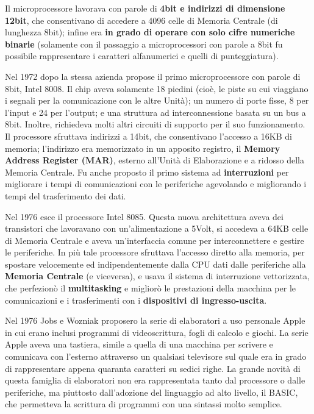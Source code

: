 \documentclass[12pt]{article}
\begin{document}
Il microprocessore lavorava con parole di\textbf{ 4bit e indirizzi di dimensione 12bit}, che consentivano di accedere a 4096 celle di Memoria Centrale (di lunghezza 8bit); infine era \textbf{in grado di operare con solo cifre numeriche binarie }(solamente con il passaggio a microprocessori con parole a 8bit fu possibile rappresentare i caratteri alfanumerici e quelli di punteggiatura).\par\medskip\noindent
Nel 1972 dopo la stessa azienda propose il primo microprocessore con parole di 8bit, Intel 8008. Il chip aveva solamente 18 piedini (cioè, le piste su cui viaggiano i segnali per la comunicazione con le altre Unità); un numero di porte fisse, 8 per l’input e 24 per l’output; e una struttura ad interconnessione basata su un bus a 8bit. Inoltre, richiedeva molti altri circuiti di supporto per il suo funzionamento. Il processore sfruttava indirizzi a 14bit, che consentivano l’accesso a 16KB di memoria; l’indirizzo era memorizzato in un apposito registro, il \textbf{Memory Address Register (MAR)}, esterno all’Unità di Elaborazione e a ridosso della Memoria Centrale. Fu anche proposto il primo sistema ad \textbf{interruzioni} per migliorare i tempi di comunicazioni con le periferiche agevolando e migliorando i tempi del trasferimento dei dati.\par\medskip\noindent
Nel 1976 esce il processore Intel 8085. Questa nuova architettura aveva dei transistori che lavoravano con un’alimentazione a 5Volt, si accedeva a 64KB celle di Memoria Centrale e aveva un’interfaccia comune per interconnettere e gestire le periferiche. In più tale processore sfruttava l’accesso diretto alla memoria, per spostare velocemente ed indipendentemente dalla CPU dati dalle periferiche alla\textbf{ Memoria Centrale }(e viceversa), e usava il sistema di interruzione vettorizzata, che perfezionò il \textbf{multitasking} e migliorò le prestazioni della macchina per le comunicazioni e i trasferimenti con i \textbf{dispositivi di ingresso-uscita}.\par\medskip\noindent
Nel 1976 Jobs e Wozniak proposero la serie di elaboratori a uso personale Apple in cui erano inclusi programmi di videoscrittura, fogli di calcolo e giochi. La serie Apple aveva una tastiera, simile a quella di una macchina per scrivere e comunicava con l’esterno attraverso un qualsiasi televisore sul quale era in grado di rappresentare appena quaranta caratteri su sedici righe. La grande novità di questa famiglia di elaboratori non era rappresentata tanto dal processore o dalle periferiche, ma piuttosto dall’adozione del linguaggio ad alto livello, il BASIC, che permetteva la scrittura di programmi con una sintassi molto semplice.\par\medskip\noindent
\end{document}
